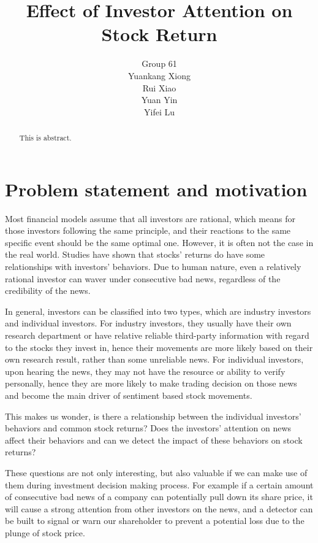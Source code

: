 \documentclass[letterpaper]{article}
\title{Effect of Investor Attention on Stock Return}
\author{%
Group 61\\
  Yuankang Xiong\\
  Rui Xiao\\
  Yuan Yin\\
  Yifei Lu
}
\begin{document}

\maketitle

\begin{abstract}
  This is abstract.
\end{abstract}

\section{Problem statement and motivation}
\label{statement}

Most financial models assume that all investors are rational, which means for those investors following the same principle, and their reactions to the same specific event should be the same optimal one. However, it is often not the case in the real world. Studies have shown that stocks’ returns do have some relationships with investors’ behaviors. Due to human nature, even a relatively rational investor can waver under consecutive bad news, regardless of the credibility of the news. 

In general, investors can be classified into two types, which are industry investors and individual investors. For industry investors, they usually have their own research department or have relative reliable third-party information with regard to the stocks they invest in, hence their movements are more likely based on their own research result, rather than some unreliable news. For individual investors, upon hearing the news, they may not have the resource or ability to verify personally, hence they are more likely to make trading decision on those news and become the main driver of sentiment based stock movements.

This makes us wonder, is there a relationship between the individual investors’ behaviors and common stock returns?  Does the investors' attention on news affect their behaviors and can we detect the impact of these behaviors on stock returns?

These questions are not only interesting, but also valuable if we can make use of them during investment decision making process. For example if a certain amount of consecutive bad news of a company can potentially pull down its share price, it will cause a strong attention from other investors on the news, and a  detector can be built to signal or warn our shareholder to prevent a potential loss due to the plunge of stock price.
\end{document}
